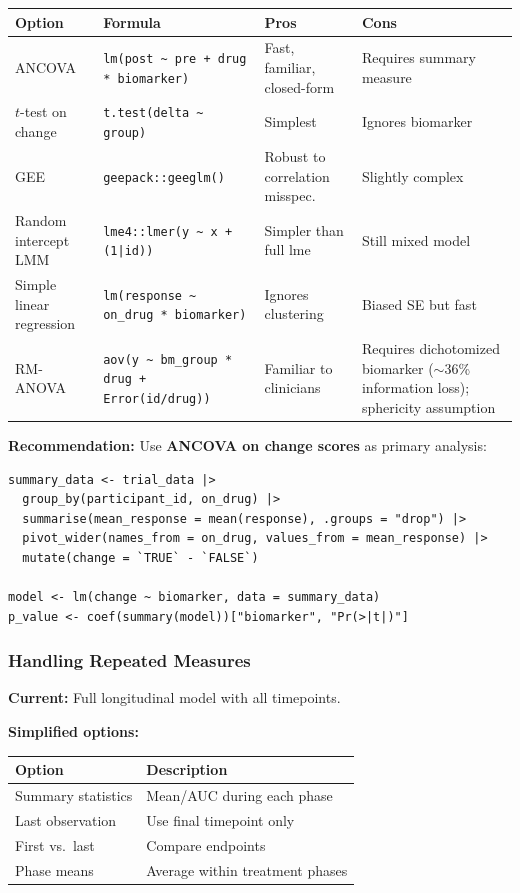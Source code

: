 \documentclass[11pt,letterpaper]{article}
\begin{document}
\begin{table}[h]
\centering\small
\begin{tabular}{@{}L{2.2cm}L{4.8cm}L{3cm}L{3.5cm}@{}}
\toprule
Option & Formula & Pros & Cons \\
\midrule
ANCOVA & \texttt{lm(post \textasciitilde{} pre + drug * biomarker)} & Fast, familiar, closed-form & Requires summary measure \\
$t$-test on change & \texttt{t.test(delta \textasciitilde{} group)} & Simplest & Ignores biomarker \\
GEE & \texttt{geepack::geeglm()} & Robust to correlation misspec. & Slightly complex \\
Random intercept LMM & \texttt{lme4::lmer(y \textasciitilde{} x + (1|id))} & Simpler than full lme & Still mixed model \\
Simple linear regression & \texttt{lm(response \textasciitilde{} on\_drug * biomarker)} & Ignores clustering & Biased SE but fast \\
RM-ANOVA & \texttt{aov(y \textasciitilde{} bm\_group * drug + Error(id/drug))} & Familiar to clinicians & Requires dichotomized biomarker ($\sim$36\% information loss); sphericity assumption \\
\bottomrule
\end{tabular}
\end{table}

\textbf{Recommendation:} Use \textbf{ANCOVA on change scores} as
primary analysis:

\begin{Verbatim}[fontsize=\small]
summary_data <- trial_data |>
  group_by(participant_id, on_drug) |>
  summarise(mean_response = mean(response), .groups = "drop") |>
  pivot_wider(names_from = on_drug, values_from = mean_response) |>
  mutate(change = `TRUE` - `FALSE`)

model <- lm(change ~ biomarker, data = summary_data)
p_value <- coef(summary(model))["biomarker", "Pr(>|t|)"]
\end{Verbatim}

\subsubsection{Handling Repeated Measures}

\textbf{Current:} Full longitudinal model with all timepoints.

\textbf{Simplified options:}

\begin{table}[h]
\centering
\begin{tabular}{@{}ll@{}}
\toprule
Option & Description \\
\midrule
Summary statistics & Mean/AUC during each phase \\
Last observation & Use final timepoint only \\
First vs.\ last & Compare endpoints \\
Phase means & Average within treatment phases \\
\bottomrule
\end{tabular}
\end{table}
\end{document}
